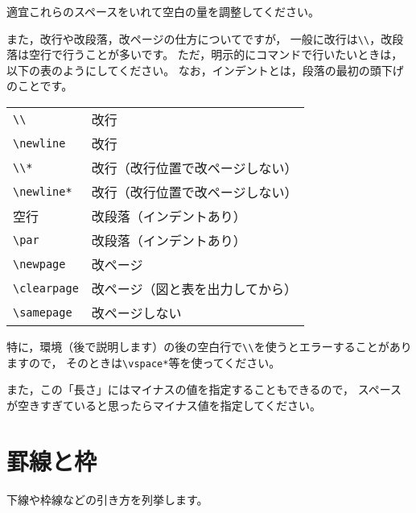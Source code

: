 適宜これらのスペースをいれて空白の量を調整してください。

また，改行や改段落，改ページの仕方についてですが，
一般に改行は\verb|\\|，改段落は空行で行うことが多いです。
ただ，明示的にコマンドで行いたいときは，
以下の表のようにしてください。
なお，インデントとは，段落の最初の頭下げのことです。\\

\begin{center}
\begin{tabular}{ll}
\verb|\\| & 改行 \\
\verb|\newline| & 改行 \\
\verb|\\*| & 改行（改行位置で改ページしない） \\
\verb|\newline*| & 改行（改行位置で改ページしない） \\
空行 & 改段落（インデントあり） \\
\verb|\par| & 改段落（インデントあり） \\
\verb|\newpage| & 改ページ \\
\verb|\clearpage| & 改ページ（図と表を出力してから） \\
\verb|\samepage| & 改ページしない
\end{tabular}
\end{center}

特に，環境（後で説明します）の後の空白行で\verb|\\|を使うとエラーすることがありますので，
そのときは\verb|\vspace*|等を使ってください。

また，この「長さ」にはマイナスの値を指定することもできるので，
スペースが空きすぎていると思ったらマイナス値を指定してください。



\section{罫線と枠}
下線や枠線などの引き方を列挙します。

